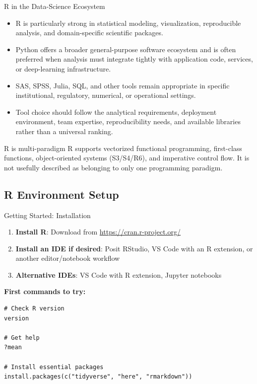 \documentclass[aspectratio=169]{beamer}
\begin{document}
\begin{frame}{R in the Data-Science Ecosystem}
  \begin{itemize}
    \item R is particularly strong in statistical modeling, visualization, reproducible analysis, and domain-specific scientific packages.
    \item Python offers a broader general-purpose software ecosystem and is often preferred when analysis must integrate tightly with application code, services, or deep-learning infrastructure.
    \item SAS, SPSS, Julia, SQL, and other tools remain appropriate in specific institutional, regulatory, numerical, or operational settings.
    \item Tool choice should follow the analytical requirements, deployment environment, team expertise, reproducibility needs, and available libraries rather than a universal ranking.
  \end{itemize}

  \begin{block}{R is multi-paradigm}
    R supports vectorized functional programming, first-class functions, object-oriented systems (S3/S4/R6), and imperative control flow. It is not usefully described as belonging to only one programming paradigm.
  \end{block}
\end{frame}

\subsection{R Environment Setup}


\begin{frame}[fragile]{Getting Started: Installation}
  \begin{enumerate}
    \item \textbf{Install R}: Download from \url{https://cran.r-project.org/}
    \item \textbf{Install an IDE if desired}: Posit RStudio, VS Code with an R extension, or another editor/notebook workflow
    \item \textbf{Alternative IDEs}: VS Code with R extension, Jupyter notebooks
  \end{enumerate}

  \vspace{1em}
  \textbf{First commands to try:}
\begin{lstlisting}
# Check R version
version

# Get help
?mean

# Install essential packages
install.packages(c("tidyverse", "here", "rmarkdown"))
\end{lstlisting}
\end{frame}
\end{document}
